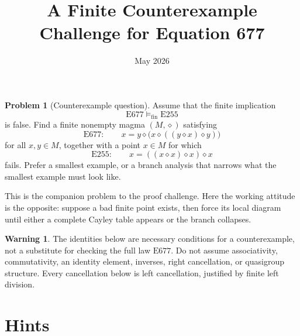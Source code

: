 \documentclass[12pt]{article}
\title{A Finite Counterexample Challenge for Equation 677}
\author{}
\date{May 2026}
\newcommand{\op}{\diamond}
\newcommand{\E}[1]{\mathrm{E#1}}
\newcommand{\fin}{\mathrm{fin}}
\theoremstyle{definition}
\newtheorem{problem}{Problem}
\newtheorem*{warning}{Warning}
\begin{document}
\maketitle

\begin{problem}[Counterexample question]
Assume that the finite implication
\[
\E{677}\models_{\fin}\E{255}
\]
is false.  Find a finite nonempty magma $(M,\op)$ satisfying
\[
\E{677}:\qquad
x=y\op\bigl(x\op((y\op x)\op y)\bigr)
\]
for all $x,y\in M$, together with a point $x\in M$ for which
\[
\E{255}:\qquad
x=((x\op x)\op x)\op x
\]
fails.  Prefer a smallest example, or a branch analysis that narrows what the smallest
example must look like.
\end{problem}

This is the companion problem to the proof challenge.  Here the working attitude is the
opposite: suppose a bad finite point exists, then force its local diagram until either a
complete Cayley table appears or the branch collapses.

\begin{warning}
The identities below are necessary conditions for a counterexample, not a substitute for
checking the full law $\E{677}$.  Do not assume associativity, commutativity, an identity
element, inverses, right cancellation, or quasigroup structure.  Every cancellation below
is left cancellation, justified by finite left division.
\end{warning}

\section*{Hints}
\end{document}
